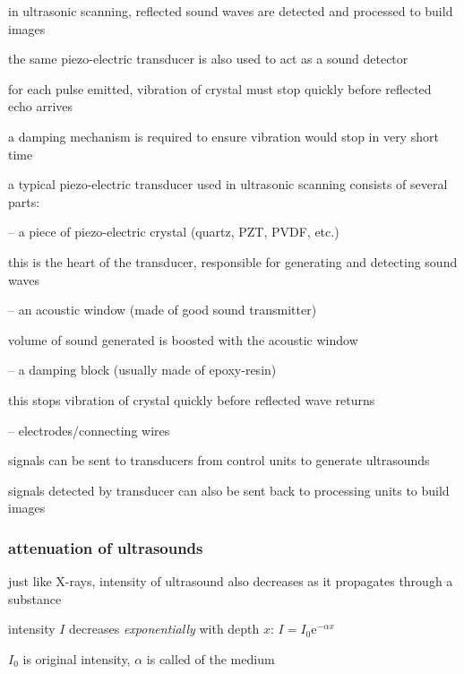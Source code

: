 \cmt in ultrasonic scanning, reflected sound waves are detected and processed to build images

the same piezo-electric transducer is also used to act as a sound detector

for each pulse emitted, vibration of crystal must stop quickly before reflected echo arrives

a damping mechanism is required to ensure vibration would stop in very short time

\cmt a typical piezo-electric transducer used in ultrasonic scanning consists of several parts:




\begin{compactitem}
	\item[--] a piece of piezo-electric crystal (quartz, PZT, PVDF, etc.)
	
	this is the heart of the transducer, responsible for generating and detecting sound waves

	\item[--] an acoustic window (made of good sound transmitter)
	
	volume of sound generated is boosted with the acoustic window
	
	\item[--] a damping block (usually made of epoxy-resin)
	
	this stops vibration of crystal quickly before reflected wave returns
	
	\item[--] electrodes/connecting wires
	
	signals can be sent to transducers from control units to generate ultrasounds
	
	signals detected by transducer can also be sent back to processing units to build images
	
	
\end{compactitem}

\subsubsection{attenuation of ultrasounds}

just like X-rays, intensity of ultrasound also decreases as it propagates through a substance

intensity $I$ decreases \emph{exponentially} with depth $x$: $\boxed{I = I_0 \mathrm{e}^{-\alpha x}}$

$I_0$ is original intensity, $\alpha$ is called  of the medium

